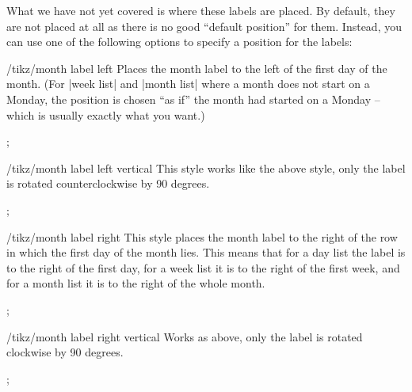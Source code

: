 What we have not yet covered is where these labels are placed. By
default, they are not placed at all as there is no good ``default
position'' for them. Instead, you can use one of the following options
to specify a position for the labels:
\begin{stylekey}{/tikz/month label left}
  Places the month label to the left of the first day of the
  month. (For |week list| and |month list| where a month does not
  start on a Monday, the position is chosen ``as if'' the month had
  started on a Monday --  which is usually exactly what you want.)
\begin{codeexample}[]
\tikz
  \calendar [dates=2000-01-28 to 2000-02-03,
             day list downward,month yshift=1em,
             month label left];
\end{codeexample}
\end{stylekey}
\begin{stylekey}{/tikz/month label left vertical}
  This style works like the above style, only the label is rotated
  counterclockwise by 90 degrees.
\begin{codeexample}[]
\tikz
  \calendar [dates=2000-01-28 to 2000-02-03,
             day list downward,month yshift=1em,
             month label left vertical];
\end{codeexample}
\end{stylekey}
\begin{stylekey}{/tikz/month label right}
  This style places the month label to the right of the row in which
  the first day of the month lies. This means that for a day list the
  label is to the right of the first day, for a week list it is to the
  right of the first week, and for a month list it is to the right of
  the whole month.
\begin{codeexample}[]
\tikz
  \calendar [dates=2000-01-28 to 2000-02-03,
             day list downward,month yshift=1em,
             month label right];
\end{codeexample}
\end{stylekey}
\begin{stylekey}{/tikz/month label right vertical}
  Works as above, only the label is rotated clockwise by 90 degrees.
\begin{codeexample}[]
\tikz
  \calendar [dates=2000-01-28 to 2000-02-03,
             day list downward,month yshift=1em,
             month label right vertical];
\end{codeexample}
\end{stylekey}

